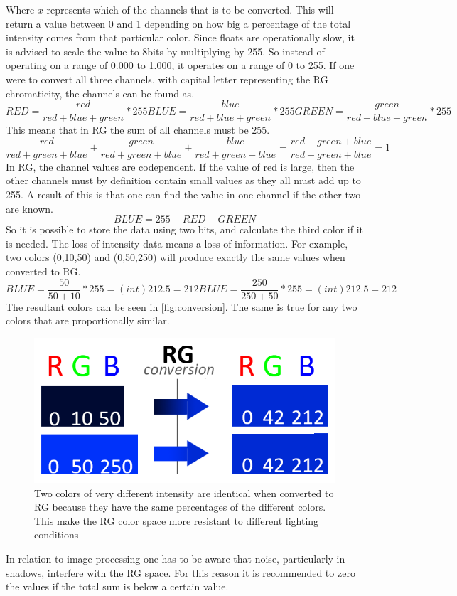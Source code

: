 Where $x$ represents which of the channels that is to be converted. This will return a value between 0 and 1 depending on how big a percentage of the total intensity comes from that particular color. Since floats are operationally slow, it is advised to scale the value to 8bits by multiplying by 255. So instead of operating on a range of 0.000 to 1.000, it operates on a range of 0 to 255. If one were to convert all three channels, with capital letter representing the RG chromaticity, the channels can be found as.
\begin{equation} 
RED = \frac{red}{red + blue + green} * 255
BLUE = \frac{blue}{red + blue + green} * 255
GREEN = \frac{green}{red + blue + green} * 255
\end{equation} 
This means that in RG the sum of all channels must be 255.
\begin{equation} 
\frac{red}{red + green + blue} + \frac{green}{red + green + blue} +  \frac{blue}{red + green + blue} =  \frac{red + green + blue}{red + green + blue} = 1
\end{equation} 
In RG, the channel values are codependent. If the value of red is large, then the other channels must by definition contain small values as they all must add up to 255. A result of this is that one can find the value in one channel if the other two are known.
\begin{equation} 
BLUE = 255 - RED - GREEN
\end{equation} 
So it is possible to store the data using two bits, and calculate the third color if it is needed. The loss of intensity data\cite{NormRGB} means a loss of information. For example, two colors (0,10,50) and (0,50,250) will produce exactly the same values when converted to RG.
\begin{equation} 
BLUE = \frac{50}{50 + 10} * 255 = (int)212.5 = 212 
BLUE = \frac{250}{250 + 50} * 255 = (int)212.5 = 212 
\end{equation} 
The resultant colors can be seen in \autoref{fig:conversion}. The same is true for any two colors that are proportionally similar.\\
\begin{figure}[H]
	\centering
	\includegraphics[width=0.6\linewidth]{figure/Analysis/rgconversion.png}
	\caption{Two colors of very different intensity are identical when converted to RG because they have the same percentages of the different colors. This make the RG color space more resistant to different lighting conditions}
	\label{fig:conversion}
\end{figure} 
In relation to image processing one has to be aware that noise, particularly in shadows, interfere with the RG space. For this reason it is recommended to zero the values if the total sum is below a certain value. 

